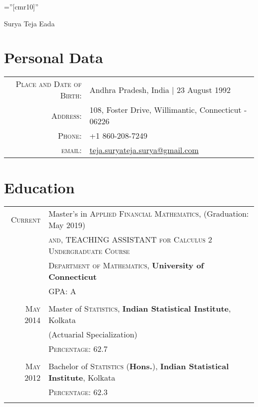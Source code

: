 \documentclass[a4paper,10pt]{article}
\begin{document}

\pagestyle{empty} %

\font\fb=''[cmr10]'' %

\par{\centering
		{\Huge Surya Teja Eada 
	}\bigskip\par}

\section{Personal Data}

\begin{tabular}{rl}
    \textsc{Place and Date of Birth:} & Andhra Pradesh, India  | 23 August 1992 \\
    \textsc{Address:}   & 108, Foster Drive, Willimantic, Connecticut - 06226 \\
    \textsc{Phone:}     & +1 860-208-7249\\
    \textsc{email:}     & \href{mailto:teja.suryateja.surya@gmail.com}{teja.suryateja.surya@gmail.com}
\end{tabular}

\section{Education}
\begin{tabular}{rl}	
 \textsc{Current}  & Master's in \textsc{Applied Financial Mathematics}, (Graduation: May 2019) \\
 & \textsc{and, TEACHING ASSISTANT for Calculus 2 Undergraduate Course} \\
 & \textsc{Department of Mathematics}, \textbf{University of Connecticut} \\
&\normalsize \textsc{GPA}: A \\&\\
 \textsc{May} 2014 & Master of \textsc{Statistics}, \textbf{Indian Statistical Institute}, Kolkata\\
 & (Actuarial Specialization) \\
&\normalsize \textsc{Percentage}: 62.7 \\&\\
\textsc{May} 2012 & Bachelor of \textsc{Statistics} (\textbf{Hons.}), \textbf{Indian Statistical Institute}, Kolkata\\ 
&\normalsize \textsc{Percentage}: 62.3 \\&\\

\end{tabular}
\end{document}
